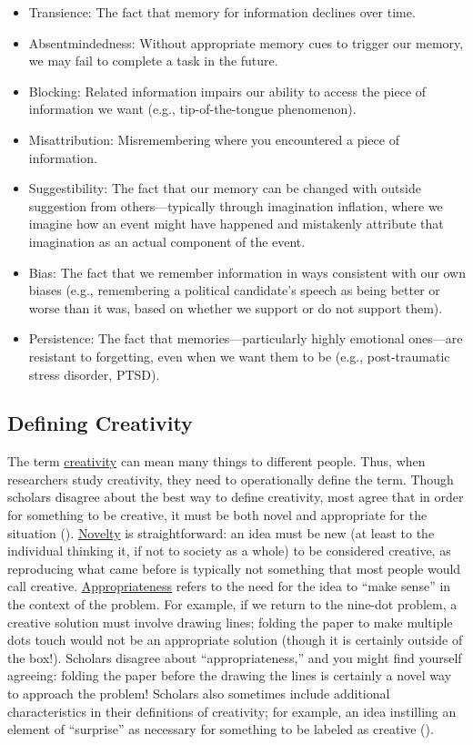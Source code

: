 \documentclass[
]{krantz}
\providecommand{\tightlist}{%
  \setlength{\itemsep}{0pt}\setlength{\parskip}{0pt}}
\begin{document}
\begin{itemize}
\tightlist
\item
  Transience: The fact that memory for information declines over time.
\item
  Absentmindedness: Without appropriate memory cues to trigger our memory, we may fail to complete a task in the future.
\item
  Blocking: Related information impairs our ability to access the piece of information we want (e.g., tip-of-the-tongue phenomenon).
\item
  Misattribution: Misremembering where you encountered a piece of information.
\item
  Suggestibility: The fact that our memory can be changed with outside suggestion from others---typically through imagination inflation, where we imagine how an event might have happened and mistakenly attribute that imagination as an actual component of the event.
\item
  Bias: The fact that we remember information in ways consistent with our own biases (e.g., remembering a political candidate's speech as being better or worse than it was, based on whether we support or do not support them).
\item
  Persistence: The fact that memories---particularly highly emotional ones---are resistant to forgetting, even when we want them to be (e.g., post-traumatic stress disorder, PTSD).
\end{itemize}

\subsection*{Defining Creativity}\label{defining-creativity}


The term \hyperref[creativity]{creativity} can mean many things to different people. Thus, when researchers study creativity, they need to operationally define the term. Though scholars disagree about the best way to define creativity, most agree that in order for something to be creative, it must be both novel and appropriate for the situation (). \hyperref[novelty]{Novelty} is straightforward: an idea must be new (at least to the individual thinking it, if not to society as a whole) to be considered creative, as reproducing what came before is typically not something that most people would call creative. \hyperref[appropriateness]{Appropriateness} refers to the need for the idea to ``make sense'' in the context of the problem. For example, if we return to the nine-dot problem, a creative solution must involve drawing lines; folding the paper to make multiple dots touch would not be an appropriate solution (though it is certainly outside of the box!). Scholars disagree about ``appropriateness,'' and you might find yourself agreeing: folding the paper before the drawing the lines is certainly a novel way to approach the problem! Scholars also sometimes include additional characteristics in their definitions of creativity; for example, an idea instilling an element of ``surprise'' as necessary for something to be labeled as creative ().
\end{document}
